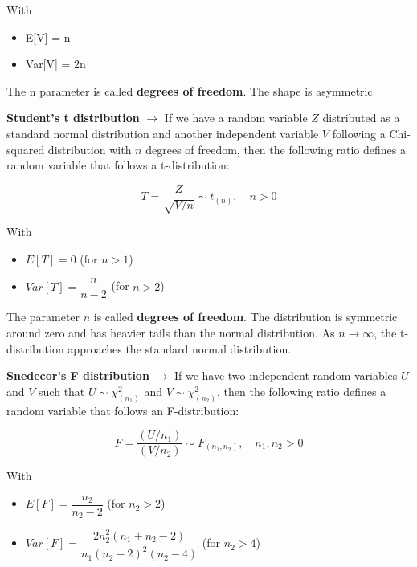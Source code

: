 With
\begin{itemize}
    \item E[V] = n
    \item Var[V] = 2n
\end{itemize}

The n parameter is called \textbf{degrees of freedom}. The shape is asymmetric

\vspace{10pt}


\textbf{Student’s t distribution} $\rightarrow$  
If we have a random variable $Z$ distributed as a standard normal distribution and another independent variable $V$ following a Chi-squared distribution with $n$ degrees of freedom, then the following ratio defines a random variable that follows a t-distribution:

\begin{equation}
    T = \frac{Z}{\sqrt{V / n}} \sim t_{(n)}, \quad n > 0
\end{equation}

With
\begin{itemize}
    \item $E[T] = 0$ \quad (for $n > 1$)
    \item $Var[T] = \dfrac{n}{n - 2}$ \quad (for $n > 2$)
\end{itemize}

The parameter $n$ is called \textbf{degrees of freedom}.  
The distribution is symmetric around zero and has heavier tails than the normal distribution.  
As $n \to \infty$, the t-distribution approaches the standard normal distribution.

\vspace{10pt}


\textbf{Snedecor’s F distribution} $\rightarrow$  
If we have two independent random variables $U$ and $V$ such that  
$U \sim \chi^2_{(n_1)}$ and $V \sim \chi^2_{(n_2)}$,  
then the following ratio defines a random variable that follows an F-distribution:

\begin{equation}
    F = \frac{(U / n_1)}{(V / n_2)} \sim F_{(n_1, n_2)}, \quad n_1, n_2 > 0
\end{equation}

With
\begin{itemize}
    \item $E[F] = \dfrac{n_2}{n_2 - 2}$ \quad (for $n_2 > 2$)
    \item $Var[F] = \dfrac{2n_2^2 (n_1 + n_2 - 2)}{n_1 (n_2 - 2)^2 (n_2 - 4)}$ \quad (for $n_2 > 4$)
\end{itemize}

